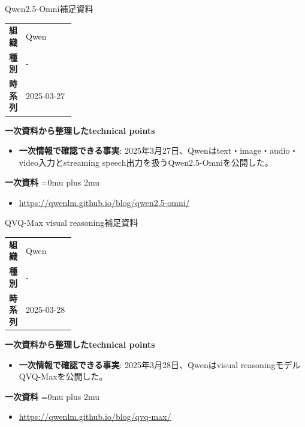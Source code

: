\begin{technicalnote}{Qwen2.5-Omni}{補足資料}
\begingroup
\begin{tabularx}{\linewidth}{@{}>{\bfseries}p{0.22\linewidth}X@{}}
組織 & Qwen \\
種別 & - \\
時系列 & 2025-03-27 \\
\end{tabularx}
\smallskip
{\bfseries 一次資料から整理したtechnical points}
\begin{itemize}[leftmargin=1.5em,itemsep=0.35em]
\item \textbf{一次情報で確認できる事実}: 2025年3月27日、Qwenはtext・image・audio・video入力とstreaming speech出力を扱うQwen2.5-Omniを公開した。
\end{itemize}
\begin{samepage}
{\bfseries 一次資料}
\begingroup\sloppy
\Urlmuskip=0mu plus 2mu\relax
\begin{itemize}[leftmargin=1.5em,itemsep=0.25em]
\item {\scriptsize\url{https://qwenlm.github.io/blog/qwen2.5-omni/}}
\end{itemize}
\endgroup
\end{samepage}
\endgroup
\end{technicalnote}
\medskip

\begin{technicalnote}{QVQ-Max visual reasoning}{補足資料}
\begingroup
\begin{tabularx}{\linewidth}{@{}>{\bfseries}p{0.22\linewidth}X@{}}
組織 & Qwen \\
種別 & - \\
時系列 & 2025-03-28 \\
\end{tabularx}
\smallskip
{\bfseries 一次資料から整理したtechnical points}
\begin{itemize}[leftmargin=1.5em,itemsep=0.35em]
\item \textbf{一次情報で確認できる事実}: 2025年3月28日、Qwenはvisual reasoningモデルQVQ-Maxを公開した。
\end{itemize}
\begin{samepage}
{\bfseries 一次資料}
\begingroup\sloppy
\Urlmuskip=0mu plus 2mu\relax
\begin{itemize}[leftmargin=1.5em,itemsep=0.25em]
\item {\scriptsize\url{https://qwenlm.github.io/blog/qvq-max/}}
\end{itemize}
\endgroup
\end{samepage}
\endgroup
\end{technicalnote}
\medskip

